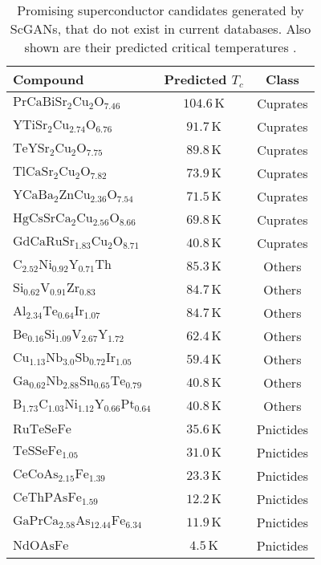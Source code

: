 \begin{table}
    \centering
    \begin{ruledtabular}
    \begin{tabular}{lcc}
        Compound & Predicted $T_c$ & Class \\ \hline
$\mathrm{PrCaBiSr_{2}Cu_{2}O_{7.46}}$ & $104.6  \, \mathrm K$ & Cuprates \\
$\mathrm{YTiSr_{2}Cu_{2.74}O_{6.76}}$ & $91.7  \, \mathrm K$ & Cuprates \\
$\mathrm{TeYSr_{2}Cu_{2}O_{7.75}}$ & $89.8  \, \mathrm K$ & Cuprates \\
$\mathrm{TlCaSr_{2}Cu_{2}O_{7.82}}$ & $73.9  \, \mathrm K$ & Cuprates \\
$\mathrm{YCaBa_{2}ZnCu_{2.36}O_{7.54}}$ & $71.5  \, \mathrm K$ & Cuprates \\
$\mathrm{HgCsSrCa_{2}Cu_{2.56}O_{8.66}}$ & $69.8  \, \mathrm K$ & Cuprates \\
$\mathrm{GdCaRuSr_{1.83}Cu_{2}O_{8.71}}$ & $40.8  \, \mathrm K$ & Cuprates \\
$\mathrm{C_{2.52}Ni_{0.92}Y_{0.71}Th}$ & $85.3  \, \mathrm K$ & Others \\
$\mathrm{Si_{0.62}V_{0.91}Zr_{0.83}}$ & $84.7  \, \mathrm K$ & Others \\
$\mathrm{Al_{2.34}Te_{0.64}Ir_{1.07}}$ & $84.7  \, \mathrm K$ & Others \\
$\mathrm{Be_{0.16}Si_{1.09}V_{2.67}Y_{1.72}}$ & $62.4  \, \mathrm K$ & Others \\
$\mathrm{Cu_{1.13}Nb_{3.0}Sb_{0.72}Ir_{1.05}}$ & $59.4  \, \mathrm K$ & Others \\
$\mathrm{Ga_{0.62}Nb_{2.88}Sn_{0.65}Te_{0.79}}$ & $40.8  \, \mathrm K$ & Others \\
$\mathrm{B_{1.73}C_{1.03}Ni_{1.12}Y_{0.66}Pt_{0.64}}$ & $40.8  \, \mathrm K$ & Others \\
$\mathrm{RuTeSeFe}$ & $35.6  \, \mathrm K$ & Pnictides \\
$\mathrm{TeSSeFe_{1.05}}$ & $31.  0\, \mathrm K$ & Pnictides \\
$\mathrm{CeCoAs_{2.15}Fe_{1.39}}$ & $23.3  \, \mathrm K$ & Pnictides \\
$\mathrm{CeThPAsFe_{1.59}}$ & $12.2  \, \mathrm K$ & Pnictides \\
$\mathrm{GaPrCa_{2.58}As_{12.44}Fe_{6.34}}$ & $11.9  \, \mathrm K$ & Pnictides \\
$\mathrm{NdOAsFe}$ & $4.5  \, \mathrm K$ & Pnictides \\

        

    \end{tabular}
    \end{ruledtabular}
    \caption{Promising superconductor candidates generated by ScGANs, that do not exist in current databases. Also shown are their predicted critical temperatures \cite{ROTER20201353689}.}
    \label{tab:predictions}
\end{table}

